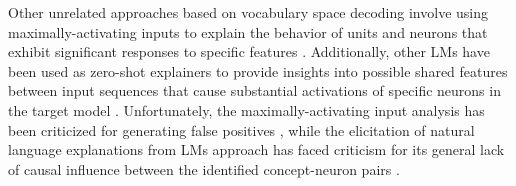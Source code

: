 

Other unrelated approaches based on vocabulary space decoding involve using maximally-activating inputs to explain the behavior of units and neurons that exhibit significant responses to specific features \cite{dalvi2018}.
Additionally, other LMs have been used as zero-shot explainers to provide insights into possible shared features between input sequences that cause substantial activations of specific neurons in the target model \cite{bills2023}.
Unfortunately, the maximally-activating input analysis has been criticized for generating false positives \cite{bolukbasi2021}, while the elicitation of natural language explanations from LMs approach has faced criticism for its general lack of causal influence between the identified concept-neuron pairs \cite{huang2023}.


